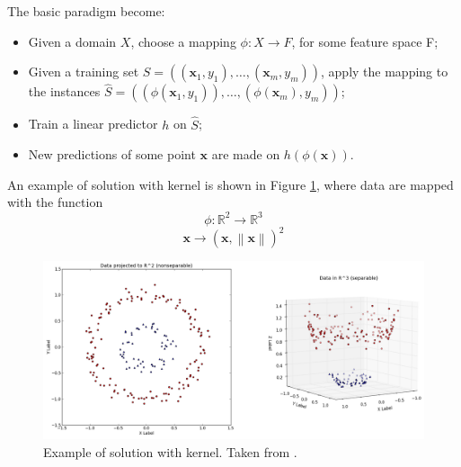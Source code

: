 The basic paradigm become:
\begin{itemize}
	\item Given a domain $X$, choose a mapping $\phi : X \rightarrow F$, for some feature space F;
	\item Given a training set $S = ((\mathbf{x}_1, y_1), \dots , (\mathbf{x}_m, y_m))$, apply the mapping to the instances $\hat{S} = ((\phi(\mathbf{x}_1, y_1)), \dots , (\phi(\mathbf{x}_m), y_m))$;
	\item Train a linear predictor $h$ on $\hat{S}$;
	\item New predictions of some point $\mathbf{x}$ are made on $h(\phi (\mathbf{x}))$.
\end{itemize}

An example of solution with kernel is shown in Figure \ref{fig:kernel-3d}, where data are mapped with the function 
\[ \phi : \mathbb{R}^2 \rightarrow \mathbb{R}^3 \]
\[ \mathbf{x} \rightarrow (\mathbf{x}, \left\lVert \mathbf{x} \right\rVert)^2 \]

\begin{figure}[ht]
	\centering
	\includegraphics[width=1\textwidth]{figures/kernel-3d.png}
	\caption{Example of solution with kernel. Taken from \cite{kernel-non-sep}.}
	\label{fig:kernel-3d}
\end{figure}

